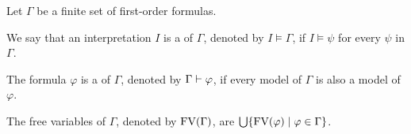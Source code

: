 \begin{definition}\label{def.2.23} %
	Let $\Gamma$ be a finite set of first-order formulas.
	\begin{description}
		\item We say that an interpretation $I$ is a  of $\Gamma$, denoted by $I\models\Gamma$, if $I\models\psi$ for every $\psi$ in $\Gamma$.
		\item The formula $\varphi$ is a  of $\Gamma$, denoted by $\Gamma\vdash\varphi$, if every model of $\Gamma$ is also a model of $\varphi$.
		\item The free variables of $\Gamma$, denoted by $\text{FV}(\Gamma)$, are $\bigcup\{\text{FV}(\varphi)\mid \varphi\in \Gamma\}$.
	\end{description}
\end{definition}

